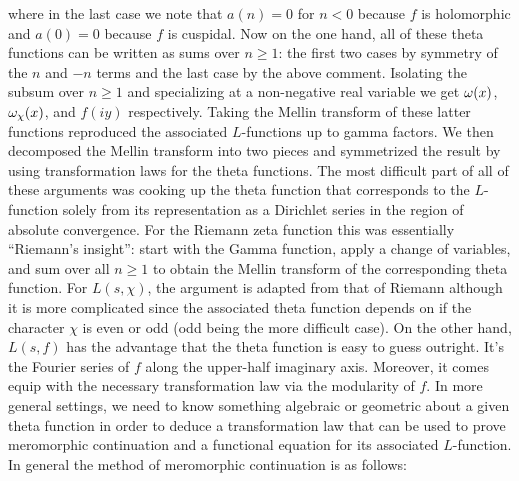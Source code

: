     where in the last case we note that $a(n) = 0$ for $n < 0$ because $f$ is holomorphic and $a(0) = 0$ because $f$ is cuspidal. Now on the one hand, all of these theta functions can be written as sums over $n \ge 1$: the first two cases by symmetry of the $n$ and $-n$ terms and the last case by the above comment. Isolating the subsum over $n \ge 1$ and specializing at a non-negative real variable we get $\omega(x)$, $\omega_{\chi}(x)$, and $f(iy)$ respectively. Taking the Mellin transform of these latter functions reproduced the associated $L$-functions up to gamma factors. We then decomposed the Mellin transform into two pieces and symmetrized the result by using transformation laws for the theta functions. The most difficult part of all of these arguments was cooking up the theta function that corresponds to the $L$-function solely from its representation as a Dirichlet series in the region of absolute convergence. For the Riemann zeta function this was essentially ``Riemann's insight'': start with the Gamma function, apply a change of variables, and sum over all $n \ge 1$ to obtain the Mellin transform of the corresponding theta function. For $L(s,\chi)$, the argument is adapted from that of Riemann although it is more complicated since the associated theta function depends on if the character $\chi$ is even or odd (odd being the more difficult case). On the other hand, $L(s,f)$ has the advantage that the theta function is easy to guess outright. It's the Fourier series of $f$ along the upper-half imaginary axis. Moreover, it comes equip with the necessary transformation law via the modularity of $f$. In more general settings, we need to know something algebraic or geometric about a given theta function in order to deduce a transformation law that can be used to prove meromorphic continuation and a functional equation for its associated $L$-function. In general the method of meromorphic continuation is as follows:

